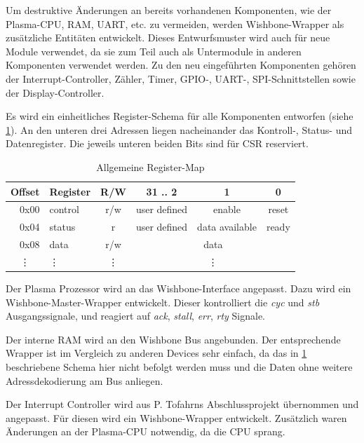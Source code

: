 Um destruktive Änderungen an bereits vorhandenen Komponenten, wie der Plasma-CPU, \gls{RAM}, \gls{UART}, etc. zu vermeiden, werden Wishbone-Wrapper als zusätzliche Entitäten entwickelt. Dieses Entwurfsmuster wird auch für neue Module verwendet, da sie zum Teil auch als Untermodule in anderen Komponenten verwendet werden. Zu den neu eingeführten Komponenten gehören der Interrupt-Controller, Zähler, Timer, \gls{GPIO}-, \gls{UART}-, \gls{SPI}-Schnittstellen sowie der Display-Controller.

Es wird ein einheitliches Register-Schema für alle Komponenten entworfen (siehe \cref{tab:device_reg_map}). An den unteren drei Adressen liegen nacheinander das Kontroll-, Status- und Datenregister. Die jeweils unteren beiden Bits sind für \gls{CSR} reserviert. 


\begin{table}[!htbp]
	\bigskip
	\centering
	\begin{tabular}{ | r | l | c | c | c | c |}
		\hline
		\textbf{Offset} & \textbf{Register} & \textbf{R/W} & \textbf{31 .. 2} & \textbf{1} & \textbf{0} \\
		\hline
		0x00 & control & r/w & user defined & enable & reset \\
		\hline
		0x04 & status &  r & user defined & data available & ready\\
		\hline
		0x08 & data & r/w & \multicolumn{3}{c|}{data} \\
		\hline
		\multicolumn{1}{|c|}{\vdots} & \vdots & \vdots & \multicolumn{3}{c|}{\vdots} \\
		\hline
	\end{tabular}
	
	\caption{Allgemeine Register-Map}
	\label{tab:device_reg_map}
\end{table}

Der Plasma Prozessor wird an das Wishbone-Interface angepasst. Dazu wird ein Wishbone-Master-Wrapper entwickelt. Dieser kontrolliert die \textit{cyc} und \textit{stb} Ausgangssignale, und reagiert auf \textit{ack}, \textit{stall}, \textit{err}, \textit{rty} Signale. 

Der interne \gls{RAM} wird an den Wishbone Bus angebunden. Der entsprechende Wrapper ist im Vergleich zu anderen Devices sehr einfach, da das in \cref{tab:device_reg_map} beschriebene Schema hier nicht befolgt werden muss und die Daten ohne weitere Adressdekodierung am Bus anliegen.

Der Interrupt Controller wird aus P. Tofahrns Abschlussprojekt \cite{article:plasma_interrupt_controller} übernommen und angepasst. Für diesen wird ein Wishbone-Wrapper entwickelt. Zusätzlich waren Änderungen an der Plasma-CPU notwendig, da die CPU  \cite[5]{article:plasma_interrupt_controller} sprang.

